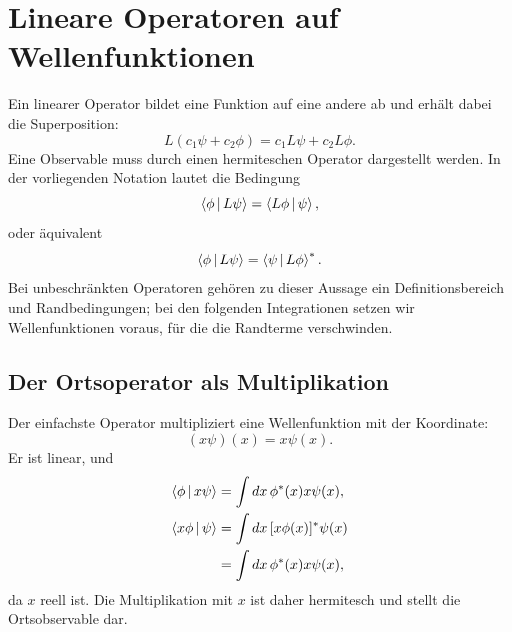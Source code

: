 \begin{classroomqa}
\end{classroomqa}

\section{Lineare Operatoren auf Wellenfunktionen}

Ein linearer Operator bildet eine Funktion auf eine andere ab und erhält dabei die Superposition:
\begin{equation}
L(c_1\psi+c_2\phi)
=
c_1L\psi+c_2L\phi.
\end{equation}
Eine Observable muss durch einen hermiteschen Operator dargestellt werden. In der vorliegenden Notation lautet die Bedingung
\begin{equation}
\left\langle\phi\,\middle|\,L\psi\right\rangle
=
\left\langle L\phi\,\middle|\,\psi\right\rangle,
\label{eq:l8-hermitian-condition}
\end{equation}
oder äquivalent
\begin{equation}
\left\langle\phi\,\middle|\,L\psi\right\rangle
=
\left\langle\psi\,\middle|\,L\phi\right\rangle^*.
\end{equation}
Bei unbeschränkten Operatoren gehören zu dieser Aussage ein Definitionsbereich und Randbedingungen; bei den folgenden Integrationen setzen wir Wellenfunktionen voraus, für die die Randterme verschwinden.

\subsection{Der Ortsoperator als Multiplikation}

Der einfachste Operator multipliziert eine Wellenfunktion mit der Koordinate:
\begin{equation}
(x\psi)(x)=x\psi(x).
\label{eq:l8-position-operator}
\end{equation}
Er ist linear, und
\begin{align}
\left\langle\phi\,\middle|\,x\psi\right\rangle
&=
\int dx\,\phi^*(x)x\psi(x), \notag\\
\left\langle x\phi\,\middle|\,\psi\right\rangle
&=
\int dx\,[x\phi(x)]^*\psi(x) \notag\\
&=
\int dx\,\phi^*(x)x\psi(x),
\end{align}
da \(x\) reell ist. Die Multiplikation mit \(x\) ist daher hermitesch und stellt die Ortsobservable dar.

